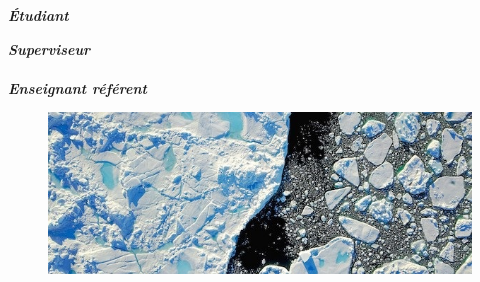 \documentclass[ 
11pt, %
french, %
singlespacing, %
parskip, %
headsepline, %
openany, %
]{MastersDoctoralThesis} %
\renewcommand{\emph}[1]{\textbf{\textit{#1}}} %
\theoremstyle{plain}
\numberwithin{theorem}{section}  %
\begin{document}
\begin{titlepage}
\begin{center}
\begin{minipage}[t]{0.4\textwidth}
\begin{flushleft} \large
\vspace{7mm}
\emph{Étudiant}\\
\href{https://github.com/desmond-rn}{\authorname} %
\end{flushleft}
\end{minipage}
\begin{minipage}[t]{0.4\textwidth}
\begin{flushright} \large
\emph{Superviseur} \\
\href{https://www-ljk.imag.fr/membres/Stephane.Labbe/}{\supname} %
\\ \vspace{5mm}
\emph{Enseignant référent} \\
\href{http://www.feelpp.org/team/prudhomm/}{\examname} %
\end{flushright}
\end{minipage}%


\begin{figure}[H]
    \centering
    \includegraphics[width=.9\linewidth]{IntroPic3.jpg}
    \label{Fig:IntroPic}
\end{figure}




\end{center}
\end{titlepage}
\end{document}
